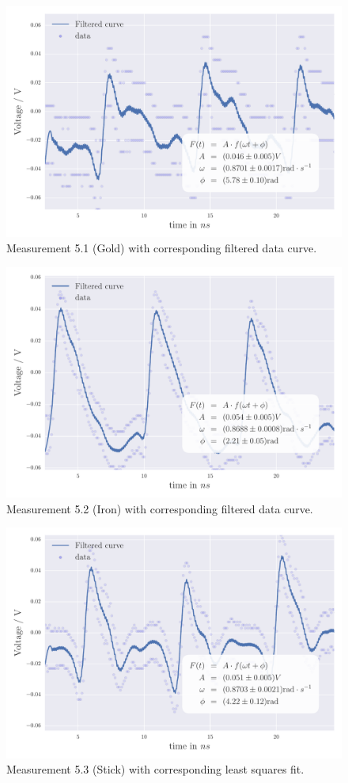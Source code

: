 \begin{figure}[H]
    \centering
    \includegraphics[width=0.7\linewidth]{analysis/figures/fit5_1}
    \caption{Measurement 5.1 (Gold) with corresponding filtered data curve.}
    \label{fig:5_1_plot}
\end{figure}
\begin{figure}[H]
    \centering
    \includegraphics[width=0.7\linewidth]{analysis/figures/fit5_2}
    \caption{Measurement 5.2 (Iron) with corresponding filtered data curve.}
    \label{fig:5_2_plot}
\end{figure}
\begin{figure}[H]
    \centering
    \includegraphics[width=0.7\linewidth]{analysis/figures/fit5_3}
    \caption{Measurement 5.3 (Stick) with corresponding least squares fit.}
    \label{fig:5_3_plot}
\end{figure}
